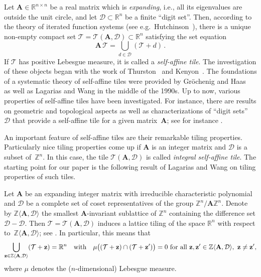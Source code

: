 \documentclass[12pt]{amsart}
\theoremstyle{definition}
\theoremstyle{remark}
\numberwithin{equation}{section}
\begin{document}
Let $\mathbf{A} \in \mathbb{R}^{n\times n}$ be a real matrix which is \emph{expanding}, i.e., all its eigenvalues are outside the unit circle, and let $\mathcal{D} \subset\mathbb{R}^n$ be a finite ``digit set''.
Then, according to the theory of iterated function systems (see e.g.\ Hutchinson~\cite{Hutchinson:81}), there is a unique non-empty compact set $\mathcal{T} = \mathcal{T}(\mathbf{A},\mathcal{D}) \subset \mathbb{R}^n$ satisfying the set equation
\[
\mathbf{A}\, \mathcal{T} = \bigcup_{d \in \mathcal{D}} (\mathcal{T} + d)\,.
\]
If $\mathcal{T}$ has positive Lebesgue measure, it is called a \emph{self-affine tile}. The investigation of these objects began with the work of Thurston~\cite{Thurston:89} and Kenyon~\cite{Kenyon:92}.
The foundations of a systematic theory of self-affine tiles were provided by Gr\"ochenig and Haas~\cite{Groechenig-Haas:94} as well as Lagarias and Wang \cite{Lagarias-Wang:96a,Lagarias-Wang:96b,Lagarias-Wang:96c,Lagarias-Wang:97} in the middle of the 1990s.
Up to now, various properties of self-affine tiles have been investigated. For instance, there are results on geometric \cite{Kenyon-Li-Strichartz-Wang:99,Strichartz-Wang:98,Duvall-Keesling-Vince:00} and topological \cite{Kirat-Lau:00,Bandt-Wang:01,Akiyama-Thuswaldner:04,Leung-Lau:07} aspects as well as characterizations of ``digit sets''~$\mathcal{D}$ that provide a self-affine tile for a given matrix~$\mathbf{A}$; see for instance \cite{Odlyzko:78,Lagarias-Wang:96a,Lau-Rao:03,Lai-Lau-Rao:13}.

An important feature of self-affine tiles are their remarkable tiling properties.
Particularly nice tiling properties come up if $\mathbf{A}$ is an integer matrix and $\mathcal{D}$ is a subset of~$\mathbb{Z}^n$. In this case, the tile $\mathcal{T}(\mathbf{A},\mathcal{D})$ is called \emph{integral self-affine tile}.
The starting point for our paper is the following result of Lagarias and Wang \cite{Lagarias-Wang:97} on tiling properties of such tiles.

Let $\mathbf{A}$ be an expanding integer matrix with irreducible characteristic polynomial and $\mathcal{D}$ be a complete set of coset representatives of the group $\mathbb{Z}^n / \mathbf{A} \mathbb{Z}^n$.
Denote by $\mathbb{Z}\langle \mathbf{A}, \mathcal{D}\rangle$ the smallest $\mathbf{A}$-invariant sublattice of $\mathbb{Z}^n$ containing the difference set $\mathcal{D} - \mathcal{D}$.
Then $\mathcal{T} = \mathcal{T}(\mathbf{A},\mathcal{D})$ induces a lattice tiling of the space $\mathbb{R}^n$ with respect to~$\mathbb{Z}\langle \mathbf{A}, \mathcal{D}\rangle$; see \cite[Corollary~6.2 and Lemma~2.1]{Lagarias-Wang:97}.
In particular, this means that
\[
\bigcup_{\mathbf{z} \in \mathbb{Z}\langle \mathbf{A},\mathcal{D}\rangle} (\mathcal{T}+\mathbf{z}) = \mathbb{R}^n \quad \hbox{with} \quad \mu\big((\mathcal{T}+\mathbf{z}) \cap (\mathcal{T}+\mathbf{z}')\big) = 0 \ \hbox{for all}\ \mathbf{z}, \mathbf{z}'\in \mathbb{Z}\langle \mathbf{A},\mathcal{D}\rangle,\ \mathbf{z} \not= \mathbf{z}',
\]
where $\mu$ denotes the ($n$-dimensional) Lebesgue measure.
\end{document}
